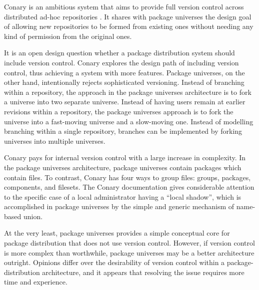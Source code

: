 \documentclass{article}
\begin{document}
Conary is an ambitious system that aims to provide full version
control across distributed ad-hoc repositories \cite{conary:web}.
It shares with
package universes the design goal of allowing new repositories to be
formed from existing ones without needing any kind of permission from
the original ones.

It is an open design question whether a package distribution system
should include version control.  Conary explores the design path of
including version control, thus achieving a system with more features.
Package universes, on the other hand, intentionally rejects
sophisticated versioning.  Instead of branching
within a repository, the approach in the package universes
architecture is to fork a universe into two separate universe.
Instead of having users remain at earlier revisions within a
repository, the package universes approach is to fork the universe
into a fast-moving universe and a slow-moving one.  Instead of modelling
branching within a single repository, branches can be implemented
by forking universes into multiple universes.

Conary pays for internal version control with a large increase in
complexity.  In the package universes architecture, package universes
contain packages which contain files.  To contrast, Conary has four
ways to group files: groups, packages, components, and filesets.  The
Conary documentation gives considerable attention to the specific case
of a local administrator having a ``local shadow'', which is
accomplished in package universes by the simple and generic mechanism of
name-based union.


At the very least, package universes provides a simple conceptual core
for package distribution that does not use version control.  However,
if version control is more complex than worthwhile, package universes
may be a better architecture outright.  Opinions differ over the
desirability of version control within a package-distribution
architecture, and it appears that resolving the issue requires more
time and experience.




\end{document}
